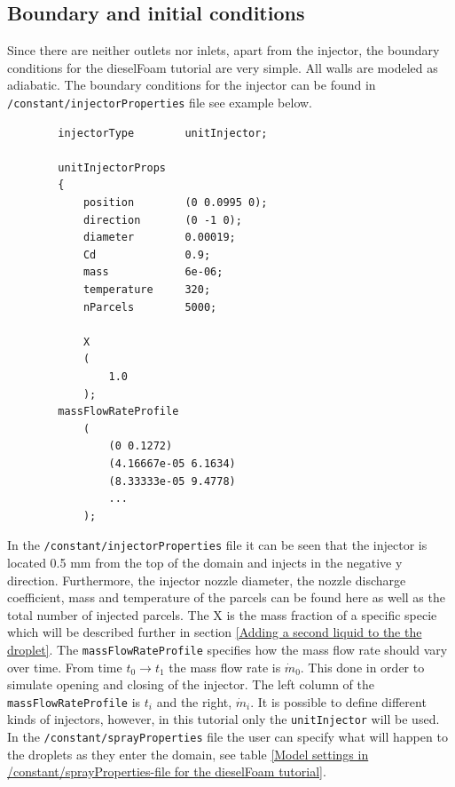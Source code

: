 \documentclass{report}
\begin{document}
\subsection{Boundary and initial conditions}
\label{Boundary and initial conditions}
Since there are neither outlets nor inlets, apart from the injector, the boundary conditions for the dieselFoam tutorial are very simple. All walls are modeled as adiabatic. 
The boundary conditions for the injector can be found in \verb+/constant/injectorProperties+ file see example below. 
\begin{verbatim}
        injectorType        unitInjector;

        unitInjectorProps
        {
            position        (0 0.0995 0);
            direction       (0 -1 0);
            diameter        0.00019;
            Cd              0.9;
            mass            6e-06;
            temperature     320;
            nParcels        5000;

            X
            (
                1.0
            ); 
	    massFlowRateProfile
            (
                (0 0.1272)
                (4.16667e-05 6.1634)
                (8.33333e-05 9.4778)
                ...
            );            		
\end{verbatim}
In the \verb+/constant/injectorProperties+ file it can be seen that the injector is located 0.5 mm from the top of the domain and injects in the negative y direction. Furthermore, the injector nozzle diameter, the nozzle discharge coefficient, mass and temperature of the parcels can be found here as well as the total number of injected parcels. The X is the mass fraction of a specific specie which will be described further in section \ref{Adding a second liquid to the the droplet}. The \verb+massFlowRateProfile+ specifies how the mass flow rate should vary over time. From time $t_0 \rightarrow t_1$ the mass flow rate is $\dot{m}_0$. This done in order to simulate opening and closing of the injector. The left column of the \verb+massFlowRateProfile+ is $t_i$ and the right, $\dot{m}_i$. 
\newpage
\noindent
It is possible to define different kinds of injectors, however, in this tutorial only the \verb+unitInjector+ will be used. In the \verb+/constant/sprayProperties+ file the user can specify what will happen to the droplets as they enter the domain, see table \ref{Model settings in /constant/sprayProperties-file for the dieselFoam tutorial}.  
\end{document}

